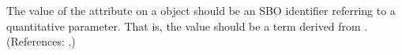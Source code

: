 The value of the attribute  on a \Parameter object should be
an SBO identifier referring to a quantitative parameter.  That is, the
value should be a term derived from \sboparameter.  (References: .)
